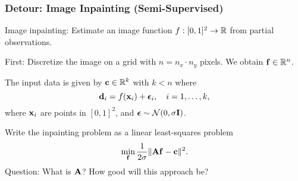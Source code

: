 \documentclass[12pt,fleqn,handout]{beamer}
\begin{document}
\begin{frame}
	\frametitle{Detour: Image Inpainting (Semi-Supervised)}
	
	Image inpainting: Estimate an image function $f : [0,1]^2 \to \mathbb{R}$ from partial observations.
	
	First: Discretize the image on a grid with $n = n_x \cdot n_y$ pixels. We obtain ${\bf f} \in \mathbb{R}^n$. 
	
	\bigskip
	\pause
	
	The input data is given by ${\bf c} \in \mathbb{R}^{k}$ with $k<n$ where 
	\begin{equation*}
		{\bf d}_i = f({\bf x}_i) + {\boldsymbol \epsilon}_i, \quad i=1,\ldots,k,
	\end{equation*}
	where ${\bf x}_i$ are points in $[0,1]^2$, and ${\boldsymbol \epsilon} \sim \mathcal{N}(0,\sigma{\bf I})$.
	
	\bigskip
	
	Write the inpainting problem as a linear least-squares problem
	\begin{equation*}
		\min_{{\bf f}} \frac{1}{2\sigma} \| {\bf A} {\bf f} - {\bf c} \|^2.
	\end{equation*} 
	Question: What is ${\bf A}$? How good will this approach be?
	
	
\end{frame}

\end{document}
